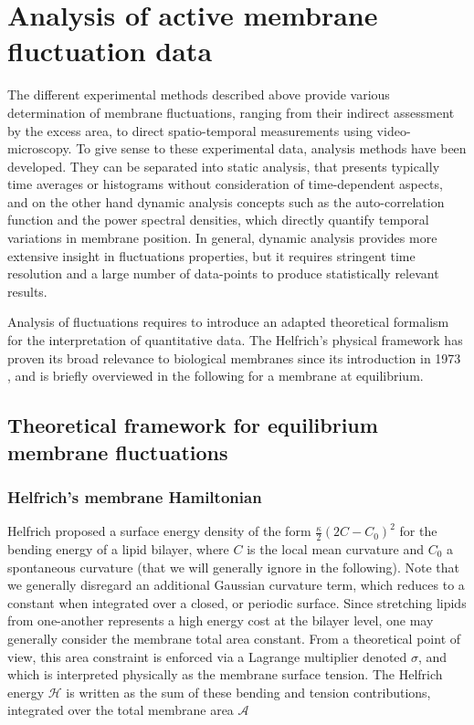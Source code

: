 \documentclass[graybox]{svmult}
\begin{document}
\section{Analysis of active membrane fluctuation data} 
The different experimental methods described above provide various determination of membrane fluctuations, ranging from their indirect assessment by the excess area, to direct spatio-temporal measurements using video-microscopy. To give sense to these experimental data, analysis methods have been developed. They can be separated into static analysis, that presents typically time averages or histograms without consideration of time-dependent aspects, and on the other hand dynamic analysis concepts such as the auto-correlation function and the power spectral densities, which directly quantify temporal variations in membrane position. In general, dynamic analysis provides more extensive insight in fluctuations properties, but it requires stringent time resolution and a large number of data-points to produce statistically relevant results. 

Analysis of fluctuations requires to introduce an adapted theoretical formalism for the interpretation of quantitative data. The Helfrich's physical framework has proven its broad relevance to biological membranes since its introduction in 1973 \cite{Helfrich:1973}, and is briefly overviewed in the following for a membrane at equilibrium.

\subsection{Theoretical framework for equilibrium membrane fluctuations}

	\subsubsection{Helfrich's membrane Hamiltonian}
Helfrich proposed a surface energy density of the form $\frac{\kappa}{2}\left(2C-C_0\right)^2$ for the bending energy of a lipid bilayer, where $C$ is the local mean curvature and $C_0$ a spontaneous curvature (that we will generally ignore in the following). Note that we generally disregard an additional Gaussian curvature term, which reduces to a constant when integrated over a closed, or periodic surface. Since stretching lipids from one-another represents a high energy cost at the bilayer level, one may generally consider the membrane total area constant. From a theoretical point of view, this area constraint is enforced via a Lagrange multiplier denoted $\sigma$, and which is interpreted physically as the membrane surface tension. The Helfrich energy $\mathcal{H}$ is written as the sum of these bending and tension contributions, integrated over the total membrane area $\mathcal{A}$
\end{document}

